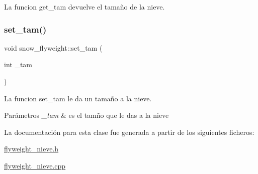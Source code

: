La funcion get\+\_\+tam devuelve el tamaño de la nieve. \mbox{\label{classsnow__flyweight_aaf41210615d014dbd8d679cc7a48003e}} 
\subsubsection{\texorpdfstring{set\+\_\+tam()}{set\_tam()}}
{\footnotesize\ttfamily void snow\+\_\+flyweight\+::set\+\_\+tam (\begin{DoxyParamCaption}\item[{int}]{\+\_\+tam }\end{DoxyParamCaption})}

La funcion set\+\_\+tam le da un tamaño a la nieve. 
\begin{DoxyParams}{Parámetros}
{\em \+\_\+tam} & es el tamño que le das a la nieve \\
\hline
\end{DoxyParams}


La documentación para esta clase fue generada a partir de los siguientes ficheros\+:\begin{DoxyCompactItemize}
\item 
\hyperlink{flyweight__nieve_8h}{flyweight\+\_\+nieve.\+h}\item 
\hyperlink{flyweight__nieve_8cpp}{flyweight\+\_\+nieve.\+cpp}\end{DoxyCompactItemize}
